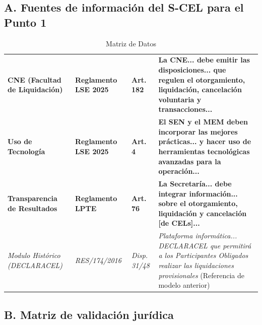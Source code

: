 \documentclass{cel}
\begin{document}
\vspace{0.4cm}
\subsection{A. Fuentes de información del S-CEL para el Punto 1}
\nopagebreak

\vspace{0.3cm}
\begin{tabladoradoLargo}
\renewcommand{\tabularxcolumn}[1]{p{#1}}
\begin{xltabular}{\textwidth}{|X|X|X|X|}
\caption{Matriz de Datos} \\
\toprule
{}  &  &  &  \\
\midrule
\endhead
\textbf{CNE (Facultad de Liquidación)} & \textbf{Reglamento LSE 2025} & \textbf{Art. 182} & \textbf{\textquotedbl{}La CNE... debe emitir las disposiciones... que regulen el otorgamiento, liquidación, cancelación voluntaria y transacciones...\textquotedbl{}} \\ \hline
\textbf{Uso de Tecnología} & \textbf{Reglamento LSE 2025} & \textbf{Art. 4} & \textbf{\textquotedbl{}El SEN y el MEM deben incorporar las mejores prácticas... y hacer uso de herramientas tecnológicas avanzadas para la operación...\textquotedbl{}} \\ \hline
\textbf{Transparencia de Resultados} & \textbf{Reglamento LPTE} & \textbf{Art. 76} & \textbf{\textquotedbl{}La Secretaría... debe integrar información... sobre el otorgamiento, liquidación y cancelación [de CELs]...\textquotedbl{}} \\ \hline
\textit{Modulo Histórico (DECLARACEL)} & \textit{RES/174/2016} & \textit{Disp. 31/48} & \textit{\textquotedbl{}Plataforma informática... DECLARACEL que permitirá a los Participantes Obligados realizar las liquidaciones provisionales\textquotedbl{}} (Referencia de modelo anterior) \\ \hline
\bottomrule
\end{xltabular}
\end{tabladoradoLargo}

\vspace{0.4cm}
\subsection{B. Matriz de validación jurídica}
\nopagebreak
\end{document}
